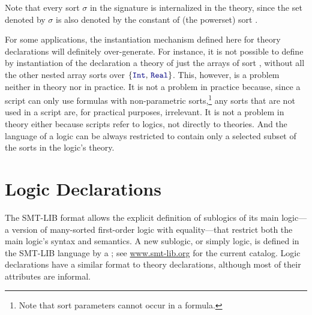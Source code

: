 %
Note that every sort $\sigma$ in the signature is internalized in the theory, 
since the set denoted by $\sigma$ is also denoted 
by the constant  of (the powerset) sort .


\smallskip
\begin{remark}
For some applications, 
the instantiation mechanism defined here for theory declarations
will definitely over-generate.
For instance, it is not possible to define by instantiation of
the  declaration 
a theory of just the arrays of sort ,
without all the other nested array sorts over $\{\ter{Int},\, \ter{Real}\}$.
This, however, is a problem neither in theory nor in practice. 
It is not a problem in practice because,
since a script can only use formulas with non-parametric sorts,\footnote{%
Note that sort parameters cannot occur in a formula.
}
any sorts that are not used in a script are, for practical purposes,
irrelevant. 
It is not a problem in theory either 
because scripts refer to logics, not directly to theories.
And the language of a logic can be always restricted to contain only
a selected subset of the sorts in the logic's theory.
\end{remark}



\section{Logic Declarations} \label{sec:logic-declarations}

The SMT-LIB format allows the explicit definition of
sublogics of its main logic--- a version of many-sorted first-order logic with equality---that 
restrict both the main logic's syntax and semantics.
A new sublogic, or simply logic, is defined in the SMT-LIB language by 
a ; see \href{http://www.smt-lib.org}{www.smt-lib.org} for the current catalog.
Logic declarations have a similar format to theory declarations,
although most of their attributes are informal.


